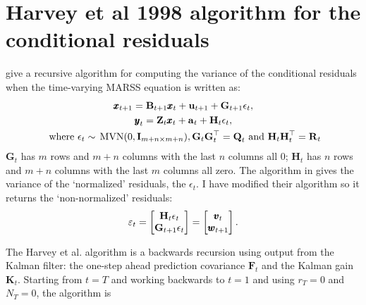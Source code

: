 \documentclass[]{article}
\def\UPS{\mbox{\boldmath $\Upsilon$}}
\def\XI{\mbox{\boldmath $\Xi$}}
\def\BB{\mbox{$\mathbf B$}}	\def\bb{\mbox{$\mathbf b$}} \def\Bb{\mbox{$\mathbf J$}} \def\Ba{\mbox{$\mathbf L$}} \def\Bm{\UPS}
\def\FF{\mbox{$\mathbf F$}} \def\ff{\mbox{$\mathbf f$}}
\def\GG{\mbox{$\mathbf G$}}	\def\gg{\mbox{$\mathbf g$}}
\def\HH{\mbox{$\mathbf H$}}	\def\hh{\mbox{$\mathbf h$}}
\def\II{\mbox{$\mathbf I$}} \def\ii{\mbox{$\mathbf i$}}
\def\KK{\mbox{$\mathbf K$}}
\def\MVN{\,\textup{\textrm{MVN}}}
\def\QQ{\mbox{$\mathbf Q$}}	 \def\qq{\mbox{$\mathbf q$}} \def\Qb{\mbox{$\mathbf G$}}  \def\Qm{\mathbb{Q}}
\def\RR{\mbox{$\mathbf R$}}	 \def\rr{\mbox{$\mathbf r$}} \def\Rb{\mbox{$\mathbf H$}}	\def\Rm{\mathbb{R}}
\def\VV{\mbox{$\pmb{V}$}}	\def\vv{\mbox{$\pmb{v}$}}
\def\ZZ{\mbox{$\mathbf Z$}}	\def\zz{\mbox{$\mathbf z$}}	\def\Zb{\mbox{$\mathbf M$}} \def\Za{\mbox{$\mathbf N$}} \def\Zm{\XI}
\def\hatVt{\widetilde{\VV}_t}
\begin{document}
\section{Harvey et al 1998 algorithm for the conditional residuals}
\citet[pgs 112-113]{Harveyetal1998} give a recursive algorithm for computing the variance of the conditional residuals when the time-varying MARSS equation is written as: 
\begin{equation}\label{eqn:residsMARSSHarvey}
\begin{gathered}
\xx_{t+1} = \BB_{t+1}\xx_t + \uu_{t+1} + \GG_{t+1}\epsilon_{t},\\
\yy_t = \ZZ_t\xx_t + \aa_t + \HH_t\epsilon_t,\\
\mbox{ where } \epsilon_t \sim \MVN(0,\II_{m+n \times m+n}), \GG_t\GG_t^\top=\QQ_t\text{ and }\HH_t\HH_t^\top=\RR_t
\end{gathered}
\end{equation}
$\GG_t$ has $m$  rows and $m+n$ columns with the last $n$ columns all 0; $\HH_t$ has $n$ rows and $m+n$ columns with the last $m$ columns all zero.  The algorithm in \citet{Harveyetal1998} gives the variance of the `normalized' residuals, the $\epsilon_t$.  I have modified their algorithm so it  returns the `non-normalized' residuals:
$$\varepsilon_t=\begin{bmatrix}\HH_t\epsilon_t\\ \GG_{t+1}\epsilon_t\end{bmatrix}=\begin{bmatrix}\vv_t\\ \ww_{t+1} \end{bmatrix}.$$

The Harvey et al. algorithm is a backwards recursion using output from the Kalman filter: the one-step ahead prediction covariance $\FF_t$  and the Kalman gain $\KK_t$. Starting from $t=T$ and working backwards to $t=1$ and using $r_T=0$ and $N_T=0$, the algorithm is 
\end{document}
